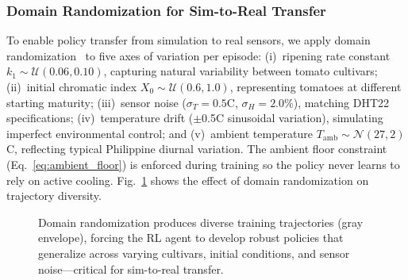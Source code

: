 \documentclass[conference]{IEEEtran}
\begin{document}
    \subsubsection{Domain Randomization for Sim-to-Real Transfer}

    To enable policy transfer from simulation to real sensors, we apply domain randomization~\cite{tobin2017sim2real} to five axes of variation per episode: (i)~ripening rate constant $k_1 \sim \mathcal{U}(0.06, 0.10)$, capturing natural variability between tomato cultivars; (ii)~initial chromatic index $X_0 \sim \mathcal{U}(0.6, 1.0)$, representing tomatoes at different starting maturity; (iii)~sensor noise ($\sigma_T = 0.5$\textdegree C, $\sigma_H = 2.0$\%), matching DHT22 specifications; (iv)~temperature drift ($\pm$0.5\textdegree C sinusoidal variation), simulating imperfect environmental control; and (v)~ambient temperature $T_{\text{amb}} \sim \mathcal{N}(27, 2)$\textdegree C, reflecting typical Philippine diurnal variation.  The ambient floor constraint (Eq.~\ref{eq:ambient_floor}) is enforced during training so the policy never learns to rely on active cooling. Fig.~\ref{fig:domain_rand} shows the effect of domain randomization on trajectory diversity.

    \begin{figure}[!t]
    \centering
    \caption{Domain randomization produces diverse training trajectories (gray envelope), forcing the RL agent to develop robust policies that generalize across varying cultivars, initial conditions, and sensor noise---critical for sim-to-real transfer.}
    \label{fig:domain_rand}
    \end{figure}
\end{document}

